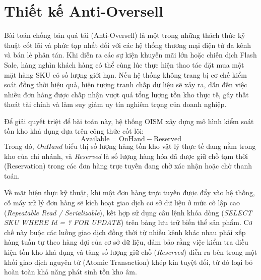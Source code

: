 \documentclass[12pt,a4paper]{report}
\begin{document}
	\section{Thiết kế Anti-Oversell}
	Bài toán chống bán quá tải (Anti-Oversell) là một trong những thách thức kỹ thuật cốt lõi và phức tạp nhất đối với các hệ thống thương mại điện tử đa kênh và bán lẻ phân tán. Khi diễn ra các sự kiện khuyến mãi lớn hoặc chiến dịch Flash Sale, hàng nghìn khách hàng có thể cùng lúc thực hiện thao tác đặt mua một mặt hàng SKU có số lượng giới hạn. Nếu hệ thống không trang bị cơ chế kiểm soát đồng thời hiệu quả, hiện tượng tranh chấp dữ liệu sẽ xảy ra, dẫn đến việc nhiều đơn hàng được chấp nhận vượt quá tổng lượng tồn kho thực tế, gây thất thoát tài chính và làm suy giảm uy tín nghiêm trọng của doanh nghiệp.
	\par
	Để giải quyết triệt để bài toán này, hệ thống OISM xây dựng mô hình kiểm soát tồn kho khả dụng dựa trên công thức cốt lõi: 
	\begin{equation*}
		\text{Available} = \text{OnHand} - \text{Reserved}
	\end{equation*}
	Trong đó, \textit{OnHand} biểu thị số lượng hàng tồn kho vật lý thực tế đang nằm trong kho của chi nhánh, và \textit{Reserved} là số lượng hàng hóa đã được giữ chỗ tạm thời (Reservation) trong các đơn hàng trực tuyến đang chờ xác nhận hoặc chờ thanh toán. 
	\par
	Về mặt hiện thực kỹ thuật, khi một đơn hàng trực tuyến được đẩy vào hệ thống, cỗ máy xử lý đơn hàng sẽ kích hoạt giao dịch cơ sở dữ liệu ở mức cô lập cao (\textit{Repeatable Read / Serializable}), kết hợp sử dụng câu lệnh khóa dòng (\textit{SELECT SKU WHERE Id = ? FOR UPDATE}) trên bảng lưu trữ biến thể sản phẩm. Cơ chế này buộc các luồng giao dịch đồng thời từ nhiều kênh khác nhau phải xếp hàng tuần tự theo hàng đợi của cơ sở dữ liệu, đảm bảo rằng việc kiểm tra điều kiện tồn kho khả dụng và tăng số lượng giữ chỗ (\textit{Reserved}) diễn ra bên trong một khối giao dịch nguyên tử (Atomic Transaction) khép kín tuyệt đối, từ đó loại bỏ hoàn toàn khả năng phát sinh tồn kho âm.
	
\end{document}
